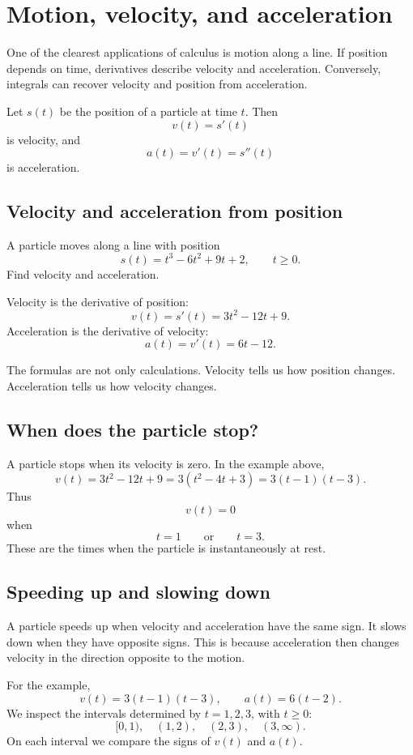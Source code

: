 \section{Motion, velocity, and acceleration}

One of the clearest applications of calculus is motion along a line. If position depends on time, derivatives describe velocity and acceleration. Conversely, integrals can recover velocity and position from acceleration.

Let \(s(t)\) be the position of a particle at time \(t\). Then
\[
v(t)=s'(t)
\]
is velocity, and
\[
a(t)=v'(t)=s''(t)
\]
is acceleration.

\subsection*{Velocity and acceleration from position}

\begin{examplebox}
A particle moves along a line with position
\[
s(t)=t^3-6t^2+9t+2,
\qquad t\ge0.
\]
Find velocity and acceleration.

Velocity is the derivative of position:
\[
v(t)=s'(t)=3t^2-12t+9.
\]
Acceleration is the derivative of velocity:
\[
a(t)=v'(t)=6t-12.
\]
\end{examplebox}

The formulas are not only calculations. Velocity tells us how position changes. Acceleration tells us how velocity changes.

\subsection*{When does the particle stop?}

A particle stops when its velocity is zero. In the example above,
\[
v(t)=3t^2-12t+9=3(t^2-4t+3)=3(t-1)(t-3).
\]
Thus
\[
v(t)=0
\]
when
\[
t=1
\qquad\text{or}\qquad
 t=3.
\]
These are the times when the particle is instantaneously at rest.

\subsection*{Speeding up and slowing down}

A particle speeds up when velocity and acceleration have the same sign. It slows down when they have opposite signs. This is because acceleration then changes velocity in the direction opposite to the motion.

For the example,
\[
v(t)=3(t-1)(t-3),
\qquad
 a(t)=6(t-2).
\]
We inspect the intervals determined by \(t=1,2,3\), with \(t\ge0\):
\[
[0,1),\quad (1,2),\quad (2,3),\quad (3,\infty).
\]
On each interval we compare the signs of \(v(t)\) and \(a(t)\).

